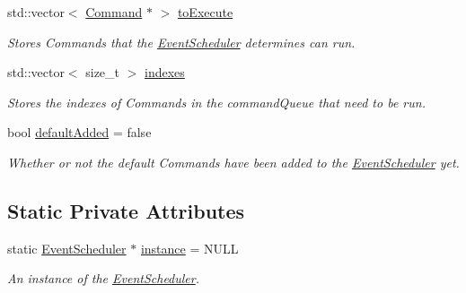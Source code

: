 \begin{DoxyCompactItemize}
\item 
\mbox{\label{classlib_iterative_robot_1_1_event_scheduler_a91ac686fb045bce48f6debdb0a351c20}} 
std\+::vector$<$ \mbox{\hyperlink{classlib_iterative_robot_1_1_command}{Command}} $\ast$ $>$ \mbox{\hyperlink{classlib_iterative_robot_1_1_event_scheduler_a91ac686fb045bce48f6debdb0a351c20}{to\+Execute}}
\begin{DoxyCompactList}\small\item\em Stores Commands that the \mbox{\hyperlink{classlib_iterative_robot_1_1_event_scheduler}{Event\+Scheduler}} determines can run. \end{DoxyCompactList}\item 
\mbox{\label{classlib_iterative_robot_1_1_event_scheduler_a1abfda2ac89947e8bb5c06478c87a5ba}} 
std\+::vector$<$ size\+\_\+t $>$ \mbox{\hyperlink{classlib_iterative_robot_1_1_event_scheduler_a1abfda2ac89947e8bb5c06478c87a5ba}{indexes}}
\begin{DoxyCompactList}\small\item\em Stores the indexes of Commands in the command\+Queue that need to be run. \end{DoxyCompactList}\item 
\mbox{\label{classlib_iterative_robot_1_1_event_scheduler_ab621dadcaf39710a2c591c72ade16885}} 
bool \mbox{\hyperlink{classlib_iterative_robot_1_1_event_scheduler_ab621dadcaf39710a2c591c72ade16885}{default\+Added}} = false
\begin{DoxyCompactList}\small\item\em Whether or not the default Commands have been added to the \mbox{\hyperlink{classlib_iterative_robot_1_1_event_scheduler}{Event\+Scheduler}} yet. \end{DoxyCompactList}\end{DoxyCompactItemize}
\subsection*{Static Private Attributes}
\begin{DoxyCompactItemize}
\item 
\mbox{\label{classlib_iterative_robot_1_1_event_scheduler_a1f4587720421057eebddc0248bf9a05f}} 
static \mbox{\hyperlink{classlib_iterative_robot_1_1_event_scheduler}{Event\+Scheduler}} $\ast$ \mbox{\hyperlink{classlib_iterative_robot_1_1_event_scheduler_a1f4587720421057eebddc0248bf9a05f}{instance}} = N\+U\+LL
\begin{DoxyCompactList}\small\item\em An instance of the \mbox{\hyperlink{classlib_iterative_robot_1_1_event_scheduler}{Event\+Scheduler}}. \end{DoxyCompactList}\end{DoxyCompactItemize}


